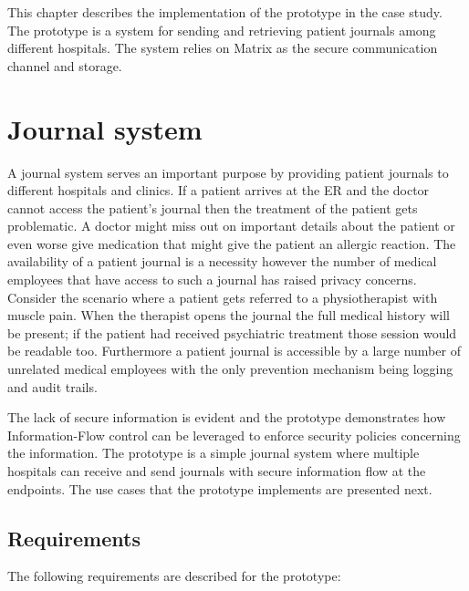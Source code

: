 This chapter describes the implementation of the prototype in the case study. The prototype is a system for sending and retrieving patient journals among different hospitals. The system relies on Matrix as the secure communication channel and storage.

\section{Journal system}

A journal system serves an important purpose by providing patient journals to different hospitals and clinics. If a patient arrives at the ER and the doctor cannot access the patient's journal then the treatment of the patient gets problematic. A doctor might miss out on important details about the patient or even worse give medication that might give the patient an allergic reaction. The availability of a patient journal is a necessity however the number of medical employees that have access to such a journal has raised privacy concerns. Consider the scenario where a patient gets referred to a physiotherapist with muscle pain. When the therapist opens the journal the full medical history will be present; if the patient had received psychiatric treatment those session would be readable too. Furthermore a patient journal is accessible by a large number of unrelated medical employees with the only prevention mechanism being logging and audit trails.


The lack of secure information is evident and the prototype demonstrates how Information-Flow control can be leveraged to enforce security policies concerning the information. The prototype is a simple journal system where multiple hospitals can receive and send journals with secure information flow at the endpoints. The use cases that the prototype implements are presented next.

\subsection{Requirements}

The following requirements are described for the prototype:

